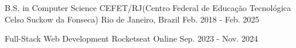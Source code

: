 

\begin{cventries}

  \cventry
    {B.S. in Computer Science} %
    {CEFET/RJ(Centro Federal de Educação Tecnológica Celso Suckow da Fonseca)} %
    {Rio de Janeiro, Brazil} %
    {Feb. 2018 - Feb. 2025} %
    {}

  \cventry
    {Full-Stack Web Development} %
    {Rocketseat} %
    {Online} %
    {Sep. 2023 - Nov. 2024} %
    {}

\end{cventries}
